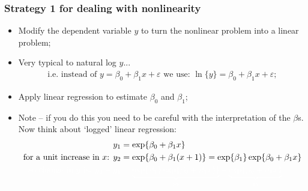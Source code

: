 \documentclass[aspectratio=169]{beamer}
\theoremstyle{principle}
\begin{document}
\begin{frame}
\frametitle{Strategy 1 for dealing with nonlinearity}

\begin{itemize}
\item Modify the dependent variable $y$ to turn the nonlinear problem into a linear problem;
\item Very typical to natural log $y$...
\begin{align*}
\mbox{i.e. instead of }y = \beta_0 + \beta_1x + \varepsilon\mbox{ we use: }\ln\{y\} = \beta_0 + \beta_1x + \varepsilon;
\end{align*}
\item Apply linear regression to estimate $\beta_0$ and $\beta_1$;
\item Note -- if you do this you need to be careful with the interpretation of the $\beta$s.  Now think about `logged' linear regression:
\begin{align*}
y_1 &= \exp\{\beta_0 + \beta_1x\}\\
\mbox{for a unit increase in $x$: } y_2 &= \exp\{\beta_0 + \beta_1(x + 1)\} = \exp\{\beta_1\}\exp\{\beta_0 + \beta_1x\}\\
\color{white}\mbox{so change in $y$ is: }y_2 - y_1 &\color{white}= \underbrace{\exp\{\beta_1\}\exp\{\beta_0 + \beta_1x)\}}_{y_2} - \underbrace{\exp\{\beta_0 + \beta_1x\}}_{y_1}
\end{align*}

\end{itemize}

\end{frame}
\end{document}
